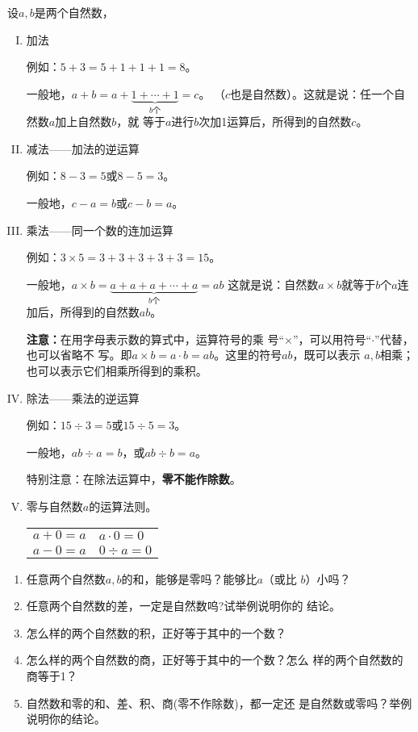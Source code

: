     设$a,b$是两个自然数，
\begin{enumerate}[I. ]
    \item 加法
    
    例如：$5+3=5+1+1+1=8$。

        一般地，$a+b=a+\underbrace{1 +\cdots +1}_{b\text{个}} =c$。  
        （$c$也是自然数）。这就是说：任一个自然数$a$加上自然数$b$，就
        等于$a$进行$b$次加1运算后，所得到的自然数$c$。
        \item 减法——加法的逆运算
        
    例如：$8-3=5$或$8-5=3$。

        一般地，$c-a=b$或$c-b=a$。
        \item 乘法——同一个数的连加运算
        
    例如：$3\times 5=3+3+3+3+3=15$。

    一般地，$a\times b =\underbrace{a+a+a+\cdots+a}_{b\text{个}}=ab$
 这就是说：自然数$a\times b$就等于$b$个$a$连加后，所得到的自然数$ab$。

 \textbf{注意：}在用字母表示数的算式中，运算符号的乘
    号“$\times$”，可以用符号“$\cdot$”代替，也可以省略不
    写。即$a\times b=a\cdot b=ab$。这里的符号$ab$，既可以表示
    $a,  b$相乘；也可以表示它们相乘所得到的乘积。

    \item 除法——乘法的逆运算

            例如：$15\div 3=5$或$15\div 5=3$。

            一般地，$ab\div a= b$，或$ab\div b = a$。

        特别注意：在除法运算中，\textbf{零不能作除数}。

        \item 零与自然数$a$的运算法则。
\begin{center}
    \begin{tabular}{ll}
        $a+0=a$& $a\cdot 0=0$\\
        $a-0=a$&  $0\div a=0$   
    \end{tabular}
\end{center}
       
\end{enumerate}         

\begin{ex}
\begin{enumerate}
    \item 任意两个自然数$a,b$的和，能够是零吗？能够比$a$（或比
    $b$）小吗？
    \item 任意两个自然数的差，一定是自然数呜?试举例说明你的
  结论。
  \item 怎么样的两个自然数的积，正好等于其中的一个数？
  \item 怎么样的两个自然数的商，正好等于其中的一个数？怎么
    样的两个自然数的商等于1？
    \item 自然数和零的和、差、积、商(零不作除数)，都一定还
    是自然数或零吗？举例说明你的结论。
  
\end{enumerate}
\end{ex}

